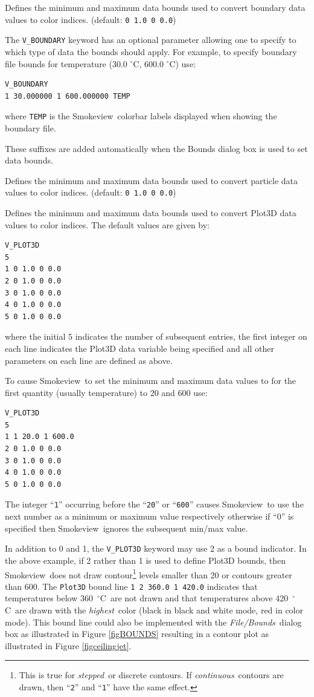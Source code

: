 \documentclass[11pt,twoside]{book}
\newcommand{\degC}{$^\circ$C}
\newcommand{\smokeview}{{Smokeview}}
\newcommand{\hitem}[1]{\item[{\bf #1} \hfill]}
\begin{document}
\hitem{V\_BOUNDARY}Defines the minimum and maximum
data bounds used to convert boundary data values to color indices.
(default: {\tt 0 1.0 0 0.0})

The {\tt V\_BOUNDARY} keyword has an optional parameter allowing
one to specify to which type of data the bounds should apply. For
example, to specify boundary file bounds for temperature (30.0
\degC, 600.0 \degC) use:
\begin{verbatim}
V_BOUNDARY
1 30.000000 1 600.000000 TEMP
\end{verbatim}
where {\tt TEMP} is the \smokeview\ colorbar labels displayed when
showing the boundary file.

These suffixes are added automatically when the Bounds dialog box is used to set data bounds.

\hitem{V\_PARTICLES}Defines the minimum and maximum
data bounds used to convert particle data values to color indices.
(default: {\tt 0 1.0 0 0.0})

\hitem{V\_PLOT3D}Defines the minimum and maximum data bounds used
to convert Plot3D data values to color indices. The default values
are given by:
\begin{verbatim}
V_PLOT3D
5
1 0 1.0 0 0.0
2 0 1.0 0 0.0
3 0 1.0 0 0.0
4 0 1.0 0 0.0
5 0 1.0 0 0.0
\end{verbatim}
where the initial $5$ indicates the number of subsequent entries,
the first integer on each line indicates the Plot3D data variable
being specified and all other parameters on each line are defined
as above.

To cause \smokeview\ to set the minimum and maximum data values to for the first quantity
(usually temperature) to 20 and 600
use:

\begin{verbatim}
V_PLOT3D
5
1 1 20.0 1 600.0
2 0 1.0 0 0.0
3 0 1.0 0 0.0
4 0 1.0 0 0.0
5 0 1.0 0 0.0
\end{verbatim}
The integer ``{\tt 1}'' occurring before the ``{\tt 20}'' or ``{\tt 600}'' causes \smokeview\
to use the next number as a minimum or maximum value respectively otherwise if ``0'' is specified
then \smokeview\ ignores the subsequent min/max value.

In addition to 0 and 1, the {\tt V\_PLOT3D} keyword may use 2 as a
bound indicator. In the above example, if 2 rather than 1 is used
to define Plot3D bounds, then \smokeview\ does not draw
contour\footnote{This is true for {\em stepped}\ or discrete
contours.  If {\em continuous}\ contours are drawn, then ``{\tt 2}''
and ``{\tt 1}'' have the same effect. } levels smaller than 20 or
contours greater than 600. The {\tt Plot3D} bound line {\tt 1 2
360.0 1 420.0} indicates that temperatures below 360~\degC\ are
not drawn and that temperatures above 420~\degC\ are drawn with
the {\em highest}\ color (black in black and white mode, red in color
mode).  This bound line could also be implemented with the {\em File/Bounds}\  dialog box as illustrated in Figure \ref{figBOUNDS}
resulting in a contour plot as illustrated in Figure
\ref{figceilingjet}.
\end{document}
